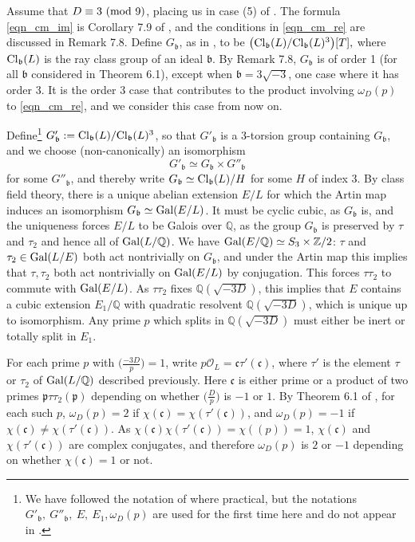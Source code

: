 \documentclass[12pt]{amsart}
\theoremstyle{remark}
\numberwithin{theorem}{section} \numberwithin{equation}{section}
\newcommand{\calO}{\mathcal{O}}
\newcommand{\mfp}{\mathfrak{p}}
\newcommand{\mfb}{\mathfrak{b}}
\newcommand{\mfc}{\mathfrak{c}}
\newcommand{\Cl}{{\text {\rm Cl}}}
\newcommand{\Q}{\mathbb{Q}}
\newcommand{\Z}{\mathbb{Z}}
\newcommand{\textmod}{{\text {\rm mod}}}
\newcommand{\Gal}{{\text {\rm Gal}}}
\begin{document}
Assume that $D \equiv 3 \ (\textmod \ 9)$, placing us in case (5) of \cite[p. 464]{CM}. The 
formula \eqref{eqn_cm_im} is Corollary 7.9 of \cite{CM}, and the conditions in \eqref{eqn_cm_re} are discussed in
Remark 7.8. Define $G_{\mfb}$, as in \cite[Theorem 6.1]{CM}, to be
$\big(\Cl_{\mfb}(L)/\Cl_{\mfb}(L)^3\big)[T],$ where $\Cl_{\mfb}(L)$ is the ray class group of an ideal $\mfb$.
By Remark 7.8, $G_{\mfb}$ is of order 1 (for all $\mfb$ considered in Theorem 6.1), except when $\mfb = 3\sqrt{-3}$, 
one case where it has order 3. 
It is the order 3 case that contributes to the product involving $\omega_D(p)$ to \eqref{eqn_cm_re}, and we consider
this case from now on.

Define\footnote{We have followed the notation of \cite{CM} where practical, but the notations
$G'_{\mfb}, \ G''_{\mfb}, \ E, \ E_1, \omega_D(p)$ are used for the first time here and do not
appear in \cite{CM}.} $G'_{\mfb} := \Cl_{\mfb}(L)/\Cl_{\mfb}(L)^3$, so that $G'_{\mfb}$ is
a 3-torsion group containing $G_{\mfb}$, and we choose (non-canonically) an isomorphism
\begin{equation}\label{eqn_nci}
G'_{\mfb} \simeq G_{\mfb} \times G''_{\mfb}
\end{equation}
for some $G''_{\mfb}$, and thereby write $G_{\mfb} \simeq \Cl_{\mfb}(L)/H$ for some $H$ of index 3.
By class field theory, there is a unique abelian extension $E/L$ for which the Artin map induces an isomorphism
$G_{\mfb} \simeq \Gal(E/L)$. It must be cyclic cubic, as $G_{\mfb}$ is, and the uniqueness forces $E/L$ to be 
Galois over $\Q$, as the group $G_{\mfb}$ is preserved by $\tau$ and $\tau_2$ and hence all of $\Gal(L/\Q)$.
We have $\Gal(E/\Q) \simeq S_3 \times \Z/2$: $\tau$ and $\tau_2 \in \Gal(L/E)$ both act nontrivially on $G_{\mfb}$,
and under the Artin map this implies that $\tau, \tau_2$ both act  nontrivially on $\Gal(E/L)$ by conjugation. This forces
$\tau \tau_2$ to commute with $\Gal(E/L)$. As $\tau \tau_2$ fixes $\Q(\sqrt{-3D})$, this implies that $E$ contains
a cubic extension $E_1/\Q$ with quadratic
resolvent $\Q(\sqrt{-3D})$, which is unique up to isomorphism. Any prime $p$
which splits in $\Q(\sqrt{-3D})$ must either be inert or totally split in $E_1$.

For each prime $p$ with $\big( \frac{-3D}{p} \big) = 1$, write $p \calO_L = \mfc \tau'(\mfc)$, where $\tau'$ is the element
$\tau$ or $\tau_2$ of $\Gal(L/\Q)$ described previously. Here $\mfc$ is either prime or a product of two primes $\mfp \tau \tau_2(\mfp)$ 
depending on whether
$\big( \frac{D}{p} \big)$ is $-1$ or $1$.
By Theorem 6.1 of \cite{CM}, for each such $p$,
$\omega_D(p) = 2$ if $\chi(\mfc) = \chi(\tau'(\mfc))$, and $\omega_D(p) = -1$ if  $\chi(\mfc) \neq \chi(\tau'(\mfc))$.
As $\chi(\mfc) \chi(\tau'(\mfc)) = \chi((p)) = 1$, 
$\chi(\mfc)$ and $\chi(\tau'(\mfc))$ are complex conjugates, and therefore
$\omega_D(p)$ is $2$ or $-1$ depending on whether $\chi(\mfc) = 1$ or not.
\end{document}
